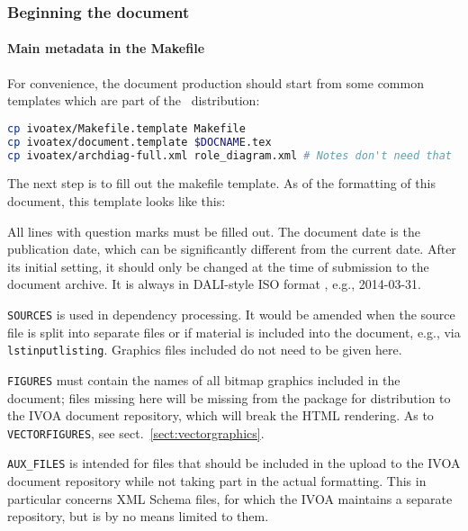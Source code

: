 \documentclass[11pt,a4paper]{ivoa}
\newcommand{\texword}[1]{\texttt{\color{texcolor} #1}}
\begin{document}
\subsubsection{Beginning the document}
\label{sect:beginning}

\paragraph{Main metadata in the Makefile}

For convenience, the document production should start from some common
templates which are part of the \ivoatex\ distribution:

\begin{lstlisting}[language=sh]
cp ivoatex/Makefile.template Makefile
cp ivoatex/document.template $DOCNAME.tex
cp ivoatex/archdiag-full.xml role_diagram.xml # Notes don't need that
\end{lstlisting}

The next step is to fill out the makefile template.  
As of the formatting of this document, this template looks like this:



All lines with question marks must be filled out.  The document date
is the publication date, which can be significantly different from the
current date.  After its initial setting, it should only be changed at
the time of submission to the document archive.  It is always in
DALI-style ISO format \citep{std:DALI}, e.g., 2014-03-31.

\texttt{SOURCES} is used in dependency processing.  It would be amended
when the source file is split into separate files or if material is
included into the document, e.g., via \texword{lstinputlisting}.
Graphics files included do not need to be given here.

\texttt{FIGURES} must contain the names of all bitmap graphics included
in the document; files missing here will be missing from the package for
distribution to the IVOA document repository, which will break the HTML
rendering.  As to \texttt{VECTORFIGURES}, see
sect.~\ref{sect:vectorgraphics}.

\texttt{AUX\_FILES} is intended for files that should be included in the
upload to the IVOA document repository while not taking part in the
actual formatting.  This in particular concerns XML Schema files, for
which the IVOA maintains a separate repository, but is by no means
limited to them.
\end{document}
